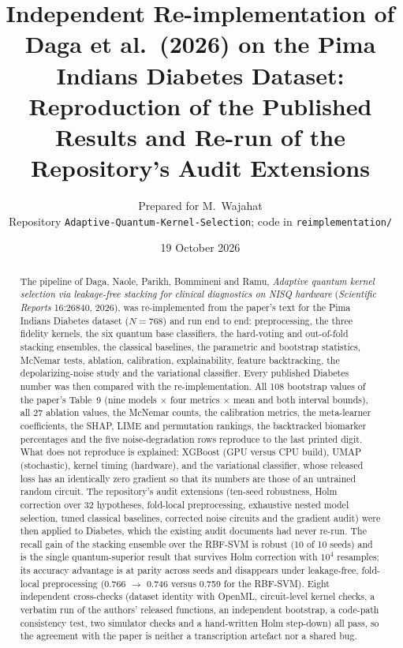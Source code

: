 \documentclass[11pt,a4paper]{article}
\title{Independent Re-implementation of Daga et al.\ (2026) on the Pima Indians Diabetes Dataset:\\
\large Reproduction of the Published Results and Re-run of the Repository's Audit Extensions}
\author{Prepared for M.~Wajahat \\ \small Repository \texttt{Adaptive-Quantum-Kernel-Selection}; code in \texttt{reimplementation/}}
\date{19 October 2026}
\begin{document}
\maketitle

\begin{abstract}
\noindent The pipeline of Daga, Naole, Parikh, Bommineni and Ramu, \emph{Adaptive quantum kernel selection via leakage-free stacking for clinical diagnostics on NISQ hardware} (\emph{Scientific Reports} 16:26840, 2026), was re-implemented from the paper's text for the Pima Indians Diabetes dataset ($N=768$) and run end to end: preprocessing, the three fidelity kernels, the six quantum base classifiers, the hard-voting and out-of-fold stacking ensembles, the classical baselines, the parametric and bootstrap statistics, McNemar tests, ablation, calibration, explainability, feature backtracking, the depolarizing-noise study and the variational classifier. Every published Diabetes number was then compared with the re-implementation. All 108 bootstrap values of the paper's Table~9 (nine models $\times$ four metrics $\times$ mean and both interval bounds), all 27 ablation values, the McNemar counts, the calibration metrics, the meta-learner coefficients, the SHAP, LIME and permutation rankings, the backtracked biomarker percentages and the five noise-degradation rows reproduce to the last printed digit. What does not reproduce is explained: XGBoost (GPU versus CPU build), UMAP (stochastic), kernel timing (hardware), and the variational classifier, whose released loss has an identically zero gradient so that its numbers are those of an untrained random circuit. The repository's audit extensions (ten-seed robustness, Holm correction over 32 hypotheses, fold-local preprocessing, exhaustive nested model selection, tuned classical baselines, corrected noise circuits and the gradient audit) were then applied to Diabetes, which the existing audit documents had never re-run. The recall gain of the stacking ensemble over the RBF-SVM is robust (10 of 10 seeds) and is the single quantum-superior result that survives Holm correction with $10^4$ resamples; its accuracy advantage is at parity across seeds and disappears under leakage-free, fold-local preprocessing (0.766 $\to$ 0.746 versus 0.759 for the RBF-SVM). Eight independent cross-checks (dataset identity with OpenML, circuit-level kernel checks, a verbatim run of the authors' released functions, an independent bootstrap, a code-path consistency test, two simulator checks and a hand-written Holm step-down) all pass, so the agreement with the paper is neither a transcription artefact nor a shared bug.
\end{abstract}
\end{document}
